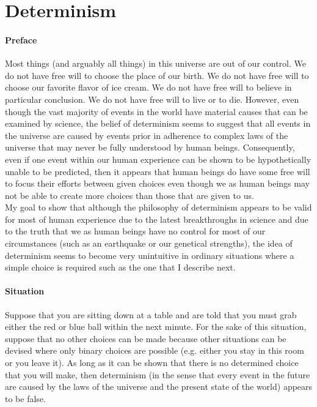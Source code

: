 \documentclass[a4paper, 12pt]{article}
\begin{document}
\section{Determinism}
\paragraph{Preface}
Most things (and arguably all things) in this universe are out of our control. We do not have free will to choose the place of our birth. We do not have free will to choose our favorite flavor of ice cream. We do not have free will to believe in particular conclusion. We do not have free will to live or to die. However, even though the vast majority of events in the world have material causes that can be examined by science, the belief of determinism seems to suggest that all events in the universe are caused by events prior in adherence to complex laws of the universe that may never be fully understood by human beings. Consequently, even if one event within our human experience can be shown to be hypothetically unable to be predicted, then it appears that human beings do have some free will to focus their efforts between given choices even though we as human beings may not be able to create more choices than those that are given to us. \\
\break
My goal to show that although the philosophy of determinism appears to be valid for most of human experience due to the latest breakthroughs in science and due to the truth that we as human beings have no control for most of our circumstances (such as an earthquake or our genetical strengths), the idea of determinism seems to become very unintuitive in ordinary situations where a simple choice is required such as the one that I describe next. \\
\paragraph{Situation}
Suppose that you are sitting down at a table and are told that you must grab either the red or blue ball within the next minute. For the sake of this situation, suppose that no other choices can be made because other situations can be devised where only binary choices are possible (e.g. either you stay in this room or you leave it). As long as it can be shown that there is no determined choice that you will make, then determinism (in the sense that every event in the future are caused by the laws of the universe and the present state of the world) appears to be false. \\
\pagebreak
\end{document}
